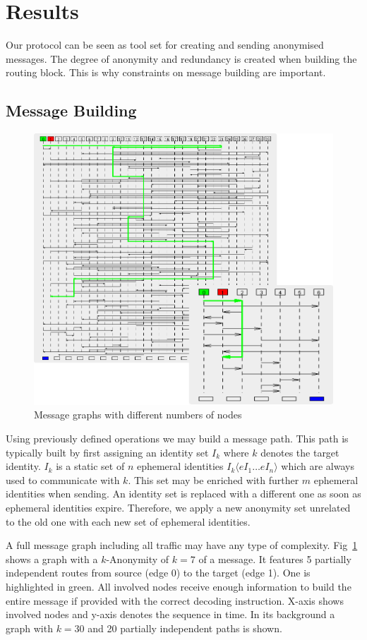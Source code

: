 \documentclass[9pt,journal,compsoc]{IEEEtran}
\begin{document}
\section{Results}
Our protocol can be seen as tool set for creating and sending anonymised messages. The degree of anonymity and redundancy is created when building the routing block. This is why constraints on message building are important.

\subsection{Message Building}
\begin{figure}[htb]
	\centering
	\includegraphics[width=0.8\columnwidth]{msgGraph3}
	\caption{Message graphs with different numbers of nodes}
	\label{fig:mgsGraph}
\end{figure}

Using previously defined operations we may build a message path. This path is typically built by first assigning an identity set $I_k$ where  $k$ denotes the target identity. $I_k$ is a static set of $n$ ephemeral identities $I_k\langle eI_1 \ldots eI_n\rangle$ which are always used to communicate with $k$. This set may be enriched with further $m$ ephemeral identities when sending. An identity set is replaced with a different one as soon as ephemeral identities expire. Therefore, we apply a new anonymity set unrelated to the old one with each new set of ephemeral identities.

A full message graph including all traffic may have any type of complexity. Fig~\ref{fig:mgsGraph} shows a graph with a $k$-Anonymity of $k=7$ of a message. It features 5 partially independent routes from source (edge 0) to the target (edge 1). One is highlighted in green. All involved nodes receive enough information to build the entire message if provided with the correct decoding instruction. X-axis shows involved nodes and y-axis denotes the sequence in time. In its background a graph with $k=30$ and 20 partially independent paths is shown.
\end{document}
